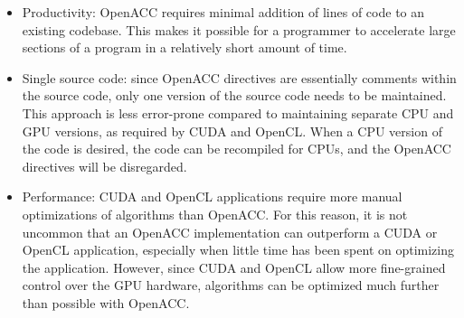 \begin{itemize}
    \item Productivity: OpenACC requires minimal addition of lines of code to an existing codebase. This makes it possible for a programmer to accelerate large sections of a program in a relatively short amount of time. 
    \item Single source code: since OpenACC directives are essentially comments within the source code, only one version of the source code needs to be maintained. This approach is less error-prone compared to maintaining separate CPU and GPU versions, as required by CUDA and OpenCL. When a CPU version of the code is desired, the code can be recompiled for CPUs, and the OpenACC directives will be disregarded.
    \item Performance: CUDA and OpenCL applications require more manual optimizations of algorithms than OpenACC. For this reason, it is not uncommon that an OpenACC implementation can outperform a CUDA or OpenCL application, especially when little time has been spent on optimizing the application. However, since CUDA and OpenCL allow more fine-grained control over the GPU hardware, algorithms can be optimized much further than possible with OpenACC.
\end{itemize}

